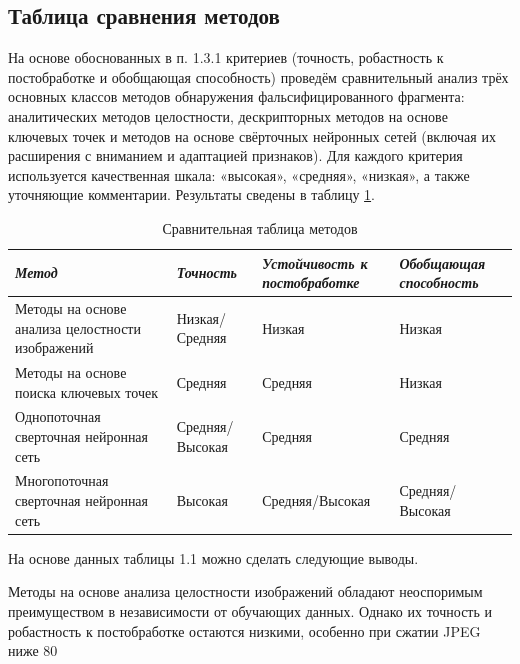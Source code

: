 \subsection{Таблица сравнения методов}

На основе обоснованных в п. 1.3.1 критериев (точность, робастность к постобработке и обобщающая способность) проведём сравнительный анализ трёх основных классов методов обнаружения фальсифицированного фрагмента: аналитических методов целостности, дескрипторных методов на основе ключевых точек и методов на основе свёрточных нейронных сетей (включая их расширения с вниманием и адаптацией признаков). Для каждого критерия используется качественная шкала: «высокая», «средняя», «низкая», а также уточняющие комментарии. Результаты сведены в таблицу \ref{tab:compare}.

\begin{table}[H]
	\centering
	\caption{Сравнительная таблица методов}\label{tab:compare}
	\begin{tabular}{|p{4cm}|p{3.6cm}|p{3.6cm}|p{3.6cm}|}
		\hline
        \textit{Метод} & \textit{Точность}  & \textit{Устойчивость к постобработке} & \textit{Обобщающая способность} \\ \hline
        Методы на основе анализа целостности изображений & Низкая/Средняя & Низкая & Низкая \\ \hline
		Методы на основе поиска ключевых точек & Средняя & Средняя & Низкая \\ \hline
		Однопоточная сверточная нейронная сеть & Средняя/Высокая & Средняя & Средняя \\ \hline
		Многопоточная сверточная нейронная сеть & Высокая & Средняя/Высокая & Средняя/Высокая \\ \hline
	\end{tabular}
\end{table}

На основе данных таблицы 1.1 можно сделать следующие выводы. 

Методы на основе анализа целостности изображений обладают неоспоримым преимуществом в независимости от обучающих данных. Однако их точность и робастность к постобработке остаются низкими, особенно при сжатии JPEG ниже 80%

